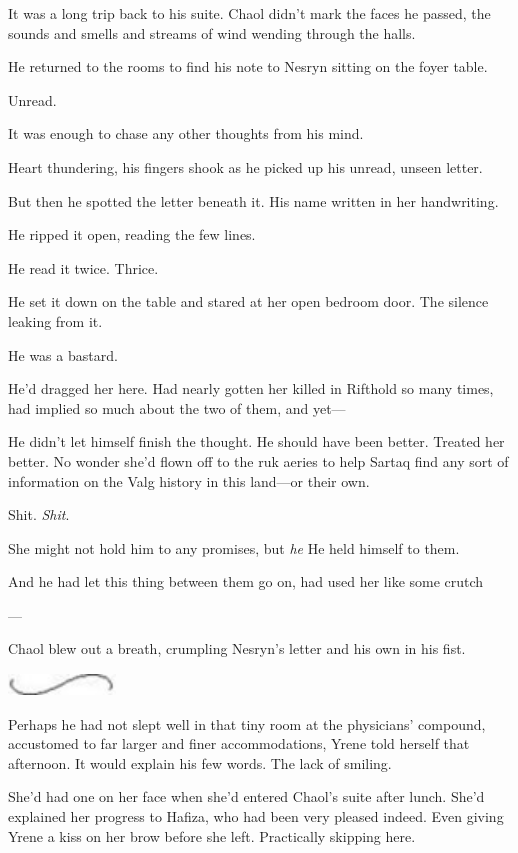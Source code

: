 It was a long trip back to his suite. Chaol didn't mark the faces he passed, the sounds and smells and streams of wind wending through the halls.

He returned to the rooms to find his note to Nesryn sitting on the foyer table.

Unread.

It was enough to chase any other thoughts from his mind.

Heart thundering, his fingers shook as he picked up his unread, unseen letter.

But then he spotted the letter beneath it. His name written in her handwriting.

He ripped it open, reading the few lines.

He read it twice. Thrice.

He set it down on the table and stared at her open bedroom door. The silence leaking from it.

He was a bastard.

He'd dragged her here. Had nearly gotten her killed in Rifthold so many times, had implied so much about the two of them, and yet---

He didn't let himself finish the thought. He should have been better. Treated her better. No wonder she'd flown off to the ruk aeries to help Sartaq find any sort of information on the Valg history in this land---or their own.

Shit. \emph{Shit}.

She might not hold him to any promises, but \emph{he}  He held himself to them.

And he had let this thing between them go on, had used her like some crutch

---

Chaol blew out a breath, crumpling Nesryn's letter and his own in his fist.

\includegraphics[width=1.12in,height=0.24in]{images/seperator}

Perhaps he had not slept well in that tiny room at the physicians' compound, accustomed to far larger and finer accommodations, Yrene told herself that afternoon. It would explain his few words. The lack of smiling.

She'd had one on her face when she'd entered Chaol's suite after lunch. She'd explained her progress to Hafiza, who had been very pleased indeed. Even giving Yrene a kiss on her brow before she left. Practically skipping here.

